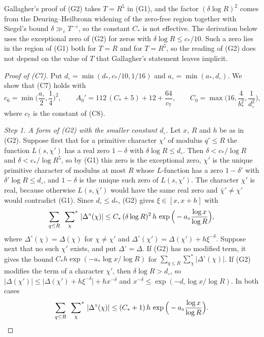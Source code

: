 Gallagher's proof of (G2) takes $T=R^5$ in (G1), and the factor $(\delta\log R)^2$ comes from the Deuring--Heilbronn widening of the zero-free region together with Siegel's bound $\delta\gg_\varepsilon T^{-\varepsilon}$, so the constant $C_\ast$ is not effective. The derivation below uses the exceptional zero of (G2) for zeros with $\delta\log R\le c_\ast/10$. Such a zero lies in the region of (G1) both for $T=R$ and for $T=R^5$, so the reading of (G2) does not depend on the value of $T$ that Gallagher's statement leaves implicit.

\begin{proof}[Proof of (C7)]
Put $d_\circ=\min(d_\ast,c_\ast/10,1/16)$ and $a_\circ=\min(a_\ast,d_\circ)$. We show that (C7) holds with
\[
c_6=\min\Big(\frac{a_\circ}2,\frac14\Big)^2,\qquad A_0'=112\,(C_\ast+5)+12+\frac{64}{c_7},\qquad C_0=\max\Big(16,\frac4{b_\ast^2},\frac1{d_\circ^2}\Big),
\]
where $c_7$ is the constant of (C8).

\emph{Step 1. A form of (G2) with the smaller constant $d_\circ$.} Let $x$, $R$ and $h$ be as in (G2). Suppose first that for a primitive character $\chi'$ of modulus $q'\le R$ the function $L(s,\chi')$ has a real zero $1-\delta$ with $\delta\log R\le d_\circ$. Then $\delta<c_\ast/\log R$ and $\delta<c_\ast/\log R^5$, so by (G1) this zero is the exceptional zero, $\chi'$ is the unique primitive character of modulus at most $R$ whose $L$-function has a zero $1-\delta'$ with $\delta'\log R\le d_\circ$, and $1-\delta$ is the unique such zero of $L(s,\chi')$. The character $\chi'$ is real, because otherwise $L(s,\bar\chi')$ would have the same real zero and $\bar\chi'\ne\chi'$ would contradict (G1). Since $d_\circ\le d_\ast$, (G2) gives $\xi\in[x,x+h]$ with
\begin{equation}\label{G2a}
\sum_{q\le R}\ \sideset{}{^\ast}\sum_{\chi}\ \lvert\Delta^\circ(\chi)\rvert\le C_\ast\,(\delta\log R)^2\,h\,\exp\Big(-a_\circ\frac{\log x}{\log R}\Big),
\end{equation}
where $\Delta^\circ(\chi)=\Delta(\chi)$ for $\chi\ne\chi'$ and $\Delta^\circ(\chi')=\Delta(\chi')+h\xi^{-\delta}$. Suppose next that no such $\chi'$ exists, and put $\Delta^\circ=\Delta$. If (G2) has no modified term, it gives the bound $C_\ast h\exp(-a_\ast\log x/\log R)$ for $\sum_{q\le R}\sum^\ast_\chi\lvert\Delta^\circ(\chi)\rvert$. If (G2) modifies the term of a character $\chi'$, then $\delta\log R>d_\circ$, so $\lvert\Delta(\chi')\rvert\le\lvert\Delta(\chi')+h\xi^{-\delta}\rvert+hx^{-\delta}$ and $x^{-\delta}\le\exp(-d_\circ\log x/\log R)$. In both cases
\begin{equation}\label{G2b}
\sum_{q\le R}\ \sideset{}{^\ast}\sum_{\chi}\ \lvert\Delta^\circ(\chi)\rvert\le(C_\ast+1)\,h\,\exp\Big(-a_\circ\frac{\log x}{\log R}\Big).
\end{equation}


\end{proof}
